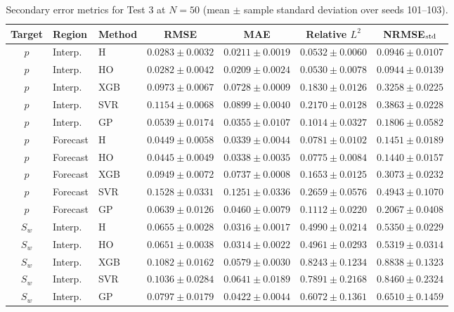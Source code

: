 \begin{table}[t]
\centering
\scriptsize
\setlength{\tabcolsep}{2.7pt}
\caption{Secondary error metrics for Test 3 at $N=50$ (mean $\pm$ sample standard deviation over seeds 101--103).}
\label{tab:secondary_test3}
\begin{tabular}{@{}cllcccc@{}}
\toprule
Target & Region & Method & RMSE & MAE & Relative $L^2$ & NRMSE$_{\rm std}$ \\
\midrule
$p$ & Interp. & H & $0.0283\pm0.0032$ & $0.0211\pm0.0019$ & $0.0532\pm0.0060$ & $0.0946\pm0.0107$ \\
$p$ & Interp. & HO & $0.0282\pm0.0042$ & $0.0209\pm0.0024$ & $0.0530\pm0.0078$ & $0.0944\pm0.0139$ \\
$p$ & Interp. & XGB & $0.0973\pm0.0067$ & $0.0728\pm0.0009$ & $0.1830\pm0.0126$ & $0.3258\pm0.0225$ \\
$p$ & Interp. & SVR & $0.1154\pm0.0068$ & $0.0899\pm0.0040$ & $0.2170\pm0.0128$ & $0.3863\pm0.0228$ \\
$p$ & Interp. & GP & $0.0539\pm0.0174$ & $0.0355\pm0.0107$ & $0.1014\pm0.0327$ & $0.1806\pm0.0582$ \\
\addlinespace[1pt]
$p$ & Forecast & H & $0.0449\pm0.0058$ & $0.0339\pm0.0044$ & $0.0781\pm0.0102$ & $0.1451\pm0.0189$ \\
$p$ & Forecast & HO & $0.0445\pm0.0049$ & $0.0338\pm0.0035$ & $0.0775\pm0.0084$ & $0.1440\pm0.0157$ \\
$p$ & Forecast & XGB & $0.0949\pm0.0072$ & $0.0737\pm0.0008$ & $0.1653\pm0.0125$ & $0.3073\pm0.0232$ \\
$p$ & Forecast & SVR & $0.1528\pm0.0331$ & $0.1251\pm0.0336$ & $0.2659\pm0.0576$ & $0.4943\pm0.1070$ \\
$p$ & Forecast & GP & $0.0639\pm0.0126$ & $0.0460\pm0.0079$ & $0.1112\pm0.0220$ & $0.2067\pm0.0408$ \\
\addlinespace[1pt]
\midrule
$S_w$ & Interp. & H & $0.0655\pm0.0028$ & $0.0316\pm0.0017$ & $0.4990\pm0.0214$ & $0.5350\pm0.0229$ \\
$S_w$ & Interp. & HO & $0.0651\pm0.0038$ & $0.0314\pm0.0022$ & $0.4961\pm0.0293$ & $0.5319\pm0.0314$ \\
$S_w$ & Interp. & XGB & $0.1082\pm0.0162$ & $0.0579\pm0.0030$ & $0.8243\pm0.1234$ & $0.8838\pm0.1323$ \\
$S_w$ & Interp. & SVR & $0.1036\pm0.0284$ & $0.0641\pm0.0189$ & $0.7891\pm0.2168$ & $0.8460\pm0.2324$ \\
$S_w$ & Interp. & GP & $0.0797\pm0.0179$ & $0.0422\pm0.0044$ & $0.6072\pm0.1361$ & $0.6510\pm0.1459$ \\

\end{tabular}
\end{table}
